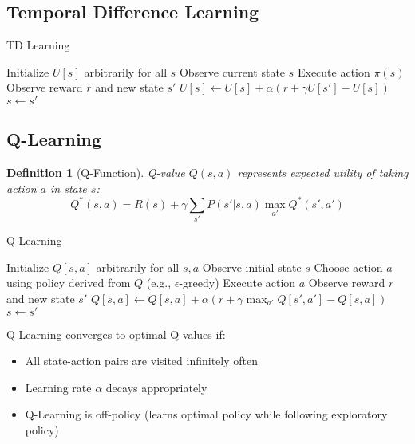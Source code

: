\documentclass[11pt,letterpaper]{article}
\newtheorem{definition}{Definition}[section]
\begin{document}
\subsection{Temporal Difference Learning}

\begin{algorithm}
\caption{TD Learning}
\begin{algorithmic}[1]
    \State Initialize $U[s]$ arbitrarily for all $s$
    \State Observe current state $s$
    \Repeat
        \State Execute action $\pi(s)$
        \State Observe reward $r$ and new state $s'$
        \State $U[s] \gets U[s] + \alpha(r + \gamma U[s'] - U[s])$
        \State $s \gets s'$
\EndFunction
\end{algorithmic}
\end{algorithm}

\subsection{Q-Learning}

\begin{definition}[Q-Function]
Q-value $Q(s,a)$ represents expected utility of taking action $a$ in state $s$:
$$Q^*(s,a) = R(s) + \gamma \sum_{s'} P(s'|s,a) \max_{a'} Q^*(s',a')$$
\end{definition}

\begin{algorithm}
\caption{Q-Learning}
\begin{algorithmic}[1]
    \State Initialize $Q[s,a]$ arbitrarily for all $s,a$
    \State Observe initial state $s$
    \Repeat
        \State Choose action $a$ using policy derived from $Q$ (e.g., $\epsilon$-greedy)
        \State Execute action $a$
        \State Observe reward $r$ and new state $s'$
        \State $Q[s,a] \gets Q[s,a] + \alpha(r + \gamma \max_{a'} Q[s',a'] - Q[s,a])$
        \State $s \gets s'$
\EndFunction
\end{algorithmic}
\end{algorithm}

\begin{important}
Q-Learning converges to optimal Q-values if:
\begin{itemize}
    \item All state-action pairs are visited infinitely often
    \item Learning rate $\alpha$ decays appropriately
    \item Q-Learning is off-policy (learns optimal policy while following exploratory policy)
\end{itemize}
\end{important}
\end{document}
